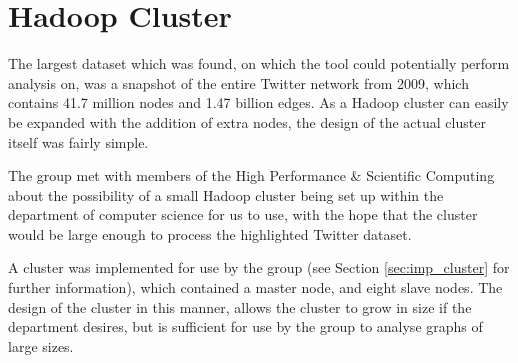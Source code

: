 \section{Hadoop Cluster}
The largest dataset which was found, on which the tool could potentially perform analysis on, was a snapshot of the entire Twitter network from 2009, which contains 41.7 million nodes and 1.47 billion edges. As a Hadoop cluster can easily be expanded with the addition of extra nodes, the design of the actual cluster itself was fairly simple.

The group met with members of the High Performance \& Scientific Computing about the possibility of a small Hadoop cluster being set up within the department of computer science for us to use, with the hope that the cluster would be large enough to process the highlighted Twitter dataset.

A cluster was implemented for use by the group (see Section \ref{sec:imp_cluster} for further information), which contained a master node, and eight slave nodes. The design of the cluster in this manner, allows the cluster to grow in size if the department desires, but is sufficient for use by the group to analyse graphs of large sizes.